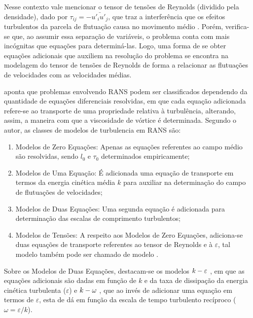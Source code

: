\documentclass[_ArquivoPrincipal.tex]{subfiles}
\begin{document}
Nesse contexto vale mencionar o tensor de tensões de Reynolds (dividido pela densidade), dado por $\tau_{ij}=-\bar{u'_iu'_j}$, que traz a interferência que os efeitos turbulentos da parcela de flutuação causa no movimento médio \cite{chou1945velocity,alfonsi2009reynolds}. Porém, verifica-se que, ao assumir essa separação de variáveis, o problema conta com mais incógnitas que equações para determiná-las. Logo, uma forma de se obter equações adicionais que auxiliem na resolução do problema se encontra na modelagem do tensor de tensões de Reynolds de forma a relacionar as flutuações de velocidades com as velocidades médias.

 aponta que problemas envolvendo RANS podem ser classificados dependendo da quantidade de equações diferenciais resolvidas, em que cada equação adicionada refere-se ao transporte de uma propriedade relativa à turbulência, alterando, assim, a maneira com que a viscosidade de vórtice é determinada. Segundo o autor, as classes de modelos de turbulencia em RANS são:

\begin{enumerate}[label=\alph*.]
    \item Modelos de Zero Equações: Apenas as equações referentes ao campo médio são resolvidas, sendo $l_0$ e $\tau_0$ determinados empiricamente;
    \item Modelos de Uma Equação: É adicionada uma equação de transporte em termos da energia cinética média $k$ para auxiliar na determinação do campo de flutuações de velocidades;
    \item Modelos de Duas Equações: Uma segunda equação é adicionada para determinação das escalas de comprimento turbulentos;
    \item Modelos de Tensões: A respeito aos Modelos de Zero Equações, adiciona-se duas equações de transporte referentes ao tensor de Reynolds e à $\varepsilon$, tal modelo também pode ser chamado de modelo \te.
\end{enumerate}

Sobre os Modelos de Duas Equações, destacam-se os modelos $k-\varepsilon$ \cite{haakansson2012experimental,davidson2014pans,parente2011improved}, em que as equações adicionais são dadas em função de $k$ e da taxa de dissipação da energia cinética turbulenta ($\varepsilon$) e $k-\omega$ \cite{larsen2018over,bassi2005discontinuous}, que ao invés de adicionar uma equação em termos de $\varepsilon$, esta de dá em função da escala de tempo turbulento recíproco ($\omega=\varepsilon/k$).
\end{document}
